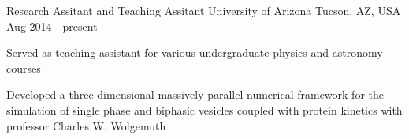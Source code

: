 
  \cventry
    {Research Assitant and Teaching Assitant} %
    {University of Arizona} %
    {Tucson, AZ, USA} %
    {Aug 2014 - present} %
    {
      \begin{cvitems} %
         \item {Served as teaching assistant for various undergraduate physics and astronomy courses}
         \item {Developed a three dimensional massively parallel numerical framework for the simulation of single phase and biphasic vesicles coupled with protein kinetics with professor Charles W. Wolgemuth}
      \end{cvitems}
    }
